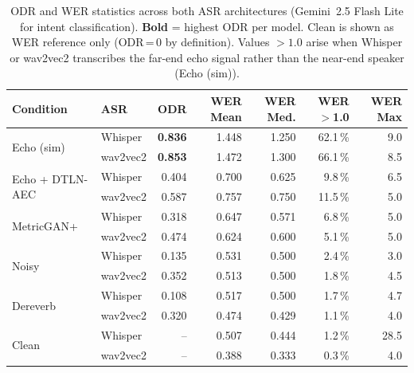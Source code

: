 \begin{table}[t]
\centering\small
\setlength{\tabcolsep}{5pt}
\begin{tabular}{llrrrrr}
\toprule
\textbf{Condition} & \textbf{ASR} & \textbf{ODR} &
\textbf{WER Mean} & \textbf{WER Med.} &
\textbf{WER${>}$1.0} & \textbf{WER Max} \\
\midrule
\multirow{2}{*}{Echo (sim)} & Whisper & \textbf{0.836} & 1.448 & 1.250 & 62.1\,\% & 9.0 \\
 & wav2vec2 & \textbf{0.853} & 1.472 & 1.300 & 66.1\,\% & 8.5 \\
\multirow{2}{*}{Echo + DTLN-AEC} & Whisper & 0.404 & 0.700 & 0.625 & 9.8\,\% & 6.5 \\
 & wav2vec2 & 0.587 & 0.757 & 0.750 & 11.5\,\% & 5.0 \\
\multirow{2}{*}{MetricGAN+} & Whisper & 0.318 & 0.647 & 0.571 & 6.8\,\% & 5.0 \\
 & wav2vec2 & 0.474 & 0.624 & 0.600 & 5.1\,\% & 5.0 \\
\multirow{2}{*}{Noisy} & Whisper & 0.135 & 0.531 & 0.500 & 2.4\,\% & 3.0 \\
 & wav2vec2 & 0.352 & 0.513 & 0.500 & 1.8\,\% & 4.5 \\
\multirow{2}{*}{Dereverb} & Whisper & 0.108 & 0.517 & 0.500 & 1.7\,\% & 4.7 \\
 & wav2vec2 & 0.320 & 0.474 & 0.429 & 1.1\,\% & 4.0 \\
\midrule
\multirow{2}{*}{Clean} & Whisper & -- & 0.507 & 0.444 & 1.2\,\% & 28.5 \\
 & wav2vec2 & -- & 0.388 & 0.333 & 0.3\,\% & 4.0 \\
\bottomrule
\end{tabular}
\caption{ODR and WER statistics across both ASR
architectures (Gemini~2.5 Flash Lite for intent
classification). \textbf{Bold} = highest ODR per model.
Clean is shown as WER reference only (ODR\,=\,0 by
definition). Values ${>}1.0$ arise when Whisper or
wav2vec2 transcribes the far-end echo signal rather
than the near-end speaker (Echo (sim)).}
\label{tab:model_comparison}
\end{table}
